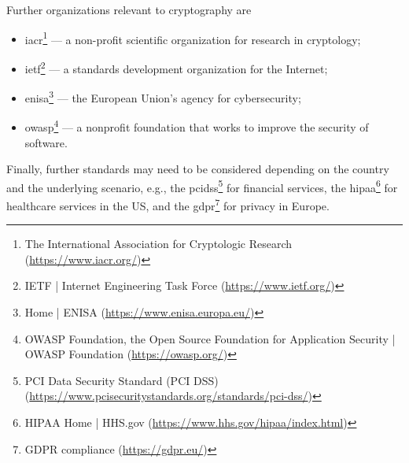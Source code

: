 Further organizations relevant to cryptography are 
\begin{itemize}
	\item \gls{iacr}\footnote{The International Association for Cryptologic Research (\url{https://www.iacr.org/})} --- a non-profit scientific organization for research in cryptology;
	\item \gls{ietf}\footnote{IETF | Internet Engineering Task Force (\url{https://www.ietf.org/})} --- a standards development organization for the Internet;
	\item \gls{enisa}\footnote{Home | ENISA (\url{https://www.enisa.europa.eu/})} --- the European Union's agency for cybersecurity;
	\item \gls{owasp}\footnote{OWASP Foundation, the Open Source Foundation for Application Security | OWASP Foundation (\url{https://owasp.org/})} --- a nonprofit foundation that works to improve the security of software.
\end{itemize}
	
Finally, further standards may need to be considered depending on the country and the underlying scenario, e.g., the \gls{pcidss}\footnote{PCI Data Security Standard (PCI DSS) (\url{https://www.pcisecuritystandards.org/standards/pci-dss/})} for financial services, the \gls{hipaa}\footnote{HIPAA Home | HHS.gov (\url{https://www.hhs.gov/hipaa/index.html})} for healthcare services in the US, and the \gls{gdpr}\footnote{GDPR compliance (\url{https://gdpr.eu/})} for privacy in Europe.



